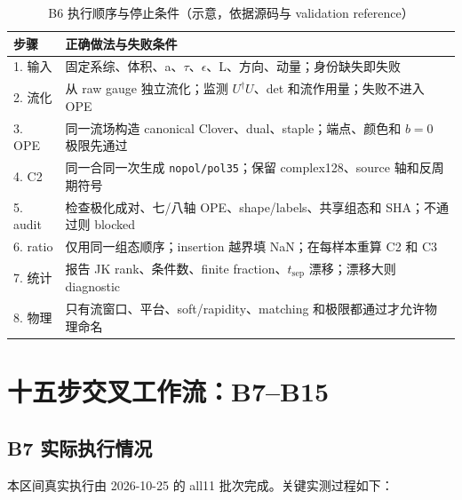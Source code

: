 \documentclass[UTF8]{ctexart}
\newcommand{\ts}{t_{\mathrm{sep}}}
\begin{document}
\begin{table}[htbp]
\centering
\small
\caption{B6 执行顺序与停止条件（示意，依据源码与 validation reference）}
\begin{tabularx}{\textwidth}{@{}l X@{}}
\toprule
步骤 & 正确做法与失败条件 \\
\midrule
1. 输入 & 固定系综、体积、a、\(\tau\)、\(\epsilon\)、L、方向、动量；身份缺失即失败 \\
2. 流化 & 从 raw gauge 独立流化；监测 \(U^\dagger U\)、det 和流作用量；失败不进入 OPE \\
3. OPE & 同一流场构造 canonical Clover、dual、staple；端点、颜色和 \(b=0\) 极限先通过 \\
4. C2 & 同一合同一次生成 \texttt{nopol/pol35}；保留 complex128、source 轴和反周期符号 \\
5. audit & 检查极化成对、七/八轴 OPE、shape/labels、共享组态和 SHA；不通过则 blocked \\
6. ratio & 仅用同一组态顺序；insertion 越界填 NaN；在每样本重算 C2 和 C3 \\
7. 统计 & 报告 JK rank、条件数、finite fraction、\(\ts\) 漂移；漂移大则 diagnostic \\
8. 物理 & 只有流窗口、平台、soft/rapidity、matching 和极限都通过才允许物理命名 \\
\bottomrule
\end{tabularx}
\end{table}

\section{十五步交叉工作流：B7--B15}

\subsection{B7 实际执行情况}

本区间真实执行由 2026-10-25 的 all11 批次完成。关键实测过程如下：
\end{document}
